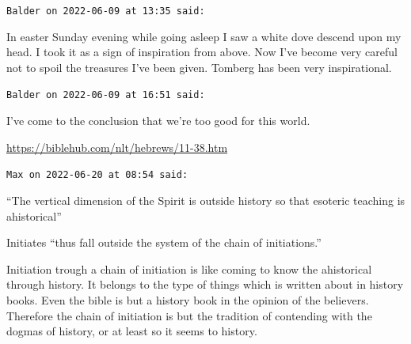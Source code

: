 \begin{footnotesize}
\begin{sffamily}
\texttt{Balder on 2022-06-09 at 13:35 said:}

In easter Sunday evening while going asleep I saw a white dove descend upon my head. I took it as a sign of inspiration from above. Now I've become very careful not to spoil the treasures I've been given. Tomberg has been very inspirational.

\hfill

\texttt{Balder on 2022-06-09 at 16:51 said:}

I've come to the conclusion that we're too good for this world.

\url{https://biblehub.com/nlt/hebrews/11-38.htm}


\hfill

\texttt{Max on 2022-06-20 at 08:54 said:}

``The vertical dimension of the Spirit is outside history so that esoteric teaching is ahistorical''

Initiates ``thus fall outside the system of the chain of initiations.''

Initiation trough a chain of initiation is like coming to know the ahistorical through history. It belongs to the type of things which is written about in history books. Even the bible is but a history book in the opinion of the believers. Therefore the chain of initiation is but the tradition of contending with the dogmas of history, or at least so it seems to history.

\end{sffamily}
\end{footnotesize}

